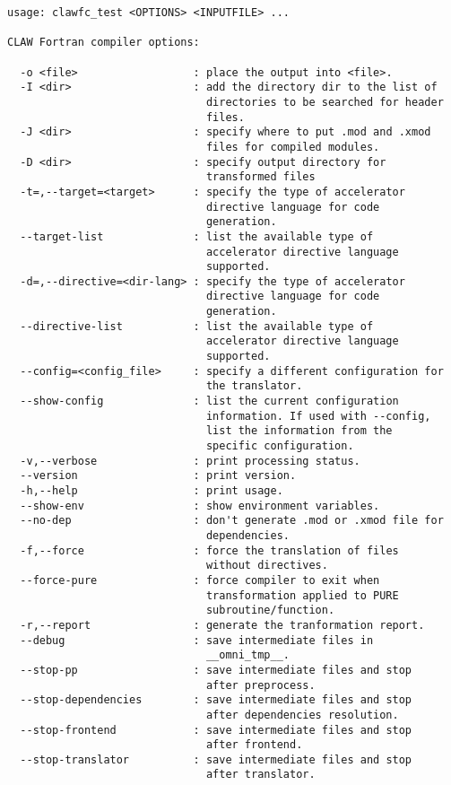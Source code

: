 \documentclass{article}
\begin{document}
\begin{lstlisting}
usage: clawfc_test <OPTIONS> <INPUTFILE> ...

CLAW Fortran compiler options:

  -o <file>                  : place the output into <file>.
  -I <dir>                   : add the directory dir to the list of
                               directories to be searched for header
                               files.
  -J <dir>                   : specify where to put .mod and .xmod
                               files for compiled modules.
  -D <dir>                   : specify output directory for
                               transformed files
  -t=,--target=<target>      : specify the type of accelerator
                               directive language for code
                               generation.
  --target-list              : list the available type of
                               accelerator directive language
                               supported.
  -d=,--directive=<dir-lang> : specify the type of accelerator
                               directive language for code
                               generation.
  --directive-list           : list the available type of
                               accelerator directive language
                               supported.
  --config=<config_file>     : specify a different configuration for
                               the translator.
  --show-config              : list the current configuration
                               information. If used with --config,
                               list the information from the
                               specific configuration.
  -v,--verbose               : print processing status.
  --version                  : print version.
  -h,--help                  : print usage.
  --show-env                 : show environment variables.
  --no-dep                   : don't generate .mod or .xmod file for
                               dependencies.
  -f,--force                 : force the translation of files
                               without directives.
  --force-pure               : force compiler to exit when
                               transformation applied to PURE
                               subroutine/function.
  -r,--report                : generate the tranformation report.
  --debug                    : save intermediate files in
                               __omni_tmp__.
  --stop-pp                  : save intermediate files and stop
                               after preprocess.
  --stop-dependencies        : save intermediate files and stop
                               after dependencies resolution.
  --stop-frontend            : save intermediate files and stop
                               after frontend.
  --stop-translator          : save intermediate files and stop
                               after translator.


\end{lstlisting}
\end{document}
